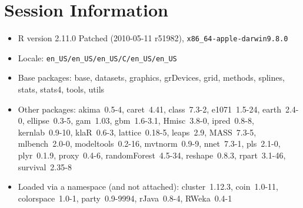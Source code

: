 \documentclass[12pt]{article}
\begin{document}
\section{Session Information}

\begin{itemize}\raggedright
  \item R version 2.11.0 Patched (2010-05-11 r51982), \verb|x86_64-apple-darwin9.8.0|
  \item Locale: \verb|en_US/en_US/en_US/C/en_US/en_US|
  \item Base packages: base, datasets, graphics, grDevices, grid,
    methods, splines, stats, stats4, tools, utils
  \item Other packages: akima~0.5-4, caret~4.41, class~7.3-2,
    e1071~1.5-24, earth~2.4-0, ellipse~0.3-5, gam~1.03, gbm~1.6-3.1,
    Hmisc~3.8-0, ipred~0.8-8, kernlab~0.9-10, klaR~0.6-3,
    lattice~0.18-5, leaps~2.9, MASS~7.3-5, mlbench~2.0-0,
    modeltools~0.2-16, mvtnorm~0.9-9, nnet~7.3-1, pls~2.1-0,
    plyr~0.1.9, proxy~0.4-6, randomForest~4.5-34, reshape~0.8.3,
    rpart~3.1-46, survival~2.35-8
  \item Loaded via a namespace (and not attached): cluster~1.12.3,
    coin~1.0-11, colorspace~1.0-1, party~0.9-9994, rJava~0.8-4,
    RWeka~0.4-1
\end{itemize}
\end{document}

